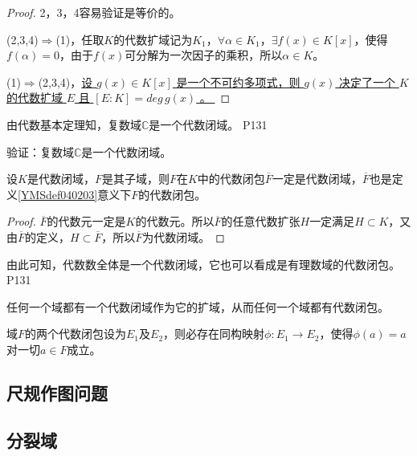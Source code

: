 \begin{proof}
	2，3，4容易验证是等价的。
	\par
	(2,3,4)$\Rightarrow$(1)，任取$K$的代数扩域记为$K_{1}$，$\forall \alpha\in K_{1}$，$\exists f(x)\in K[x]$，使得$f(\alpha)=0$，由于$f(x)$可分解为一次因子的乘积，所以$\alpha\in K$。
	\par
	(1)$\Rightarrow$(2,3,4)，\uline{设 $g(x)\in K[x]$ 是一个不可约多项式，则 $g(x)$ 决定了一个 $K$ 的代数扩域 $E$ 且 $[E:K]=deg\, g(x)$ 。  }
\end{proof}

\original
{
	由代数基本定理知，复数域$\mathbb{C}$是一个代数闭域。
}
{P131}

\begin{proposition}
	验证：复数域$\mathbb{C}$是一个代数闭域。
\end{proposition}


\begin{theorem}
	设$K$是代数闭域，$F$是其子域，则$F$在$K$中的代数闭包$\overline{F}$一定是代数闭域，$\overline{F}$也是定义\ref{YMSdef040203}意义下$F$的代数闭包。
\end{theorem}

\begin{proof}
	$\overline{F}$的代数元一定是$K$的代数元。所以$\overline{F}$的任意代数扩张$H$一定满足$H\subset K$，又由$\overline{F}$的定义，$H\subset \overline{F}$，所以$\overline{F}$为代数闭域。
\end{proof}

\original
{
	由此可知，代数数全体是一个代数闭域，它也可以看成是有理数域的代数闭包。
}
{P131}

\begin{theorem}
	任何一个域都有一个代数闭域作为它的扩域，从而任何一个域都有代数闭包。
\end{theorem}


\begin{theorem}
	域$F$的两个代数闭包设为$E_{1}$及$E_{2}$，则必存在同构映射$\phi:E_{1}\rightarrow E_{2}$，使得$\phi(a)=a$对一切$a\in F$成立。
\end{theorem}

\subsection{尺规作图问题}



\subsection{分裂域}

